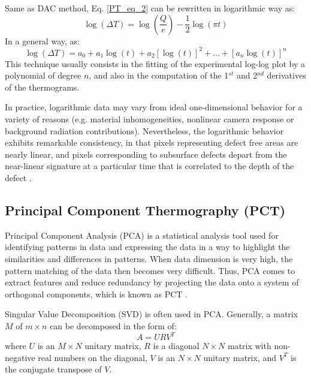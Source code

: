 Same as DAC method, Eq. \ref{PT_eq_2} can be rewritten  in logarithmic way as:
\begin{equation}
\log (\Delta T) = \log (\frac{Q}{e}) - \frac{1}{2}\log (\pi t)
\end{equation}
In a general way, as: %
\begin{equation}
\log (\Delta T) = a_0 + a_1\log (t) + a_2[\log (t)]^2 +...+ [a_n\log(t)]^n
\end{equation}
This technique usually consists in the fitting of the experimental log-log plot by a polynomial of degree $n$, and also in the computation of the 1$^{st}$ and 2$^{nd}$ derivatives of the thermograms.

In practice, logarithmic data may vary from ideal one-dimensional behavior for a variety of reasons (e.g. material inhomogeneities, nonlinear camera response or background radiation contributions). Nevertheless, the logarithmic behavior exhibits remarkable consistency, in that pixels representing defect free areas are nearly linear, and pixels corresponding to subsurface defects depart from the near-linear signature at a particular time that is correlated to the depth of the defect \citep{Shepard2002,Shepard2003}.


\subsection{Principal Component Thermography (PCT)}
Principal Component Analysis (PCA) is a statistical analysis tool used for identifying patterns in data and expressing the data in a way to highlight the similarities and differences in patterns. When data dimension is very high, the pattern matching of the data then becomes very difficult. Thus, PCA comes to extract features and reduce redundancy by projecting the data onto a system of orthogonal components, which is known as PCT \cite{Rajic2002,Rajic2002a}. 

Singular Value Decomposition (SVD) is often used in PCA. Generally, a matrix $M$ of $m\times n$ can be decomposed in the form of:
\begin{equation}
A = U R V^T
\end{equation}
where $U$ is an $M\times N$ unitary matrix, $R$ is a diagonal $N \times N$ matrix with non-negative real numbers on the diagonal, $V$ is an $N\times N$ unitary matrix, and $V^T$ is the conjugate transpose of $V$.

